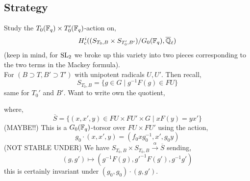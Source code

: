 \documentclass[12pt]{article}
\begin{document}
\subsection{Strategy}

Study the $T_0(\mathbb{F}_q) \times T_0'(\mathbb{F}_q)$-action on,
\[ H^i_c((S_{T_0, B} \times S_{T_0', B'})/G_0(\mathbb{F}_q), \overline{\mathbb{Q}}_\ell) \]
(keep in mind, for $\mathrm{SL}_2$ we broke up this variety into two pieces corresponding to the two terms in the Mackey formula). 
\bigskip\\
For $(B \supset T, B' \supset T')$ with unipotent radicals $U, U'$. Then recall,
\[ S_{T_0, B} = \{ g \in G \mid g^{-1} F(g) \in F U \} \]
same for $T_0'$ and $B'$. Want to write own the quotient,
\begin{center}
\end{center}
where,
\[ \overline{S} = \{ (x, x', y) \in FU \times F U' \times G \mid x F(y) = y x' \} \]
(MAYBE!!) This is a $G_0(\mathbb{F}_q)$-torsor over $F U \times F U'$ using the action,
\[ g_0 \cdot (x, x', y) = (f_0 x g_0^{-1}, x', g_0 y) \]
(NOT STABLE UNDER)
We have $S_{T_0, B} \times S_{T_0, B} \xrightarrow{\alpha} \overline{S}$ sending,
\[ (g, g') \mapsto (g^{-1} F(g), g'^{-1} F(g'), g^{-1} g') \]
this is certainly invariant under $(g_0, g_0) \cdot (g, g')$.

\begin{rmk}

\end{rmk}
\end{document}

